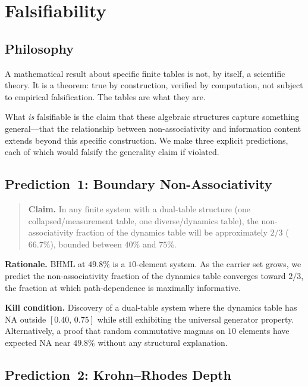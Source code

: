 \documentclass[11pt,a4paper]{article}
\theoremstyle{definition}
\theoremstyle{remark}
\newcommand{\NA}{\mathrm{NA}}
\newcommand{\BHML}{\mathrm{BHML}}
\begin{document}
\section{Falsifiability}\label{sec:falsify}

\subsection{Philosophy}\label{sec:falsify-phil}

A mathematical result about specific finite tables is not, by itself, a scientific theory. It is a theorem: true by construction, verified by computation, not subject to empirical falsification. The tables are what they are.

What \emph{is} falsifiable is the claim that these algebraic structures capture something general---that the relationship between non-associativity and information content extends beyond this specific construction. We make three explicit predictions, each of which would falsify the generality claim if violated.

\subsection{Prediction~1: Boundary Non-Associativity}\label{sec:pred1}

\begin{quote}
\textbf{Claim.} In any finite system with a dual-table structure (one collapsed/measurement table, one diverse/dynamics table), the non-associativity fraction of the dynamics table will be approximately $2/3$ ($66.7\%$), bounded between $40\%$ and $75\%$.
\end{quote}

\textbf{Rationale.} $\BHML$ at $49.8\%$ is a $10$-element system. As the carrier set grows, we predict the non-associativity fraction of the dynamics table converges toward $2/3$, the fraction at which path-dependence is maximally informative.

\textbf{Kill condition.} Discovery of a dual-table system where the dynamics table has $\NA$ outside $[0.40,\,0.75]$ while still exhibiting the universal generator property. Alternatively, a proof that random commutative magmas on $10$ elements have expected $\NA$ near $49.8\%$ without any structural explanation.

\subsection{Prediction~2: Krohn--Rhodes Depth}\label{sec:pred2}
\end{document}
